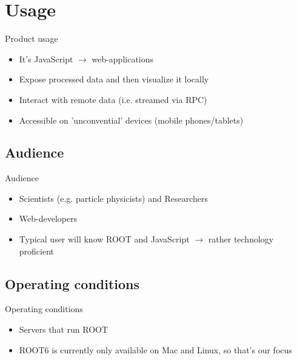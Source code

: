 \section{Usage}
\begin{frame}{Product usage}
        \begin{itemize}
		\item It's JavaScript $\rightarrow$ web-applications
		\item Expose processed data and then visualize it locally
		\item Interact with remote data (i.e. streamed via RPC)
		\item Accessible on 'unconvential' devices (mobile phones/tablets)
        \end{itemize}
\end{frame}


\subsection{Audience}
\begin{frame}{Audience}
        \begin{itemize}
		\item Scientists (e.g. particle physicists) and Researchers
		\item Web-developers
		\item Typical user will know ROOT and JavaScript $\rightarrow$ rather technology proficient
        \end{itemize}
\end{frame}

\subsection{Operating conditions}
\begin{frame}{Operating conditions}
        \begin{itemize}
                \item Servers that run ROOT
                \item ROOT6 is currently only available on Mac and Linux, so that's our focus
        \end{itemize}
\end{frame}
